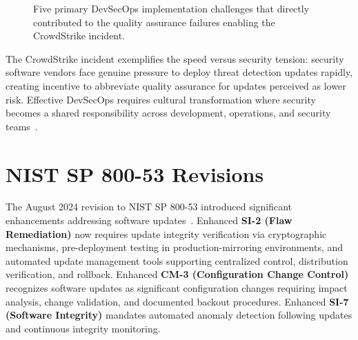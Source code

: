 \documentclass[sigconf,nonacm]{acmart}
\begin{document}
\begin{figure}[h]
\centering
{}
\caption{Five primary DevSecOps implementation challenges that directly contributed
  to the quality assurance failures enabling the CrowdStrike incident.}
\label{fig:challenges}
\end{figure}

The CrowdStrike incident exemplifies the speed versus security tension: security software
vendors face genuine pressure to deploy threat detection updates rapidly, creating incentive
to abbreviate quality assurance for updates perceived as lower risk. Effective DevSecOps
requires cultural transformation where security becomes a shared responsibility across
development, operations, and security teams~\cite{rajapakse2022challenges}.

\section{NIST SP 800-53 Revisions}

The August 2024 revision to NIST SP 800-53 introduced significant enhancements addressing
software updates~\cite{nist2024sp80053}. Enhanced \textbf{SI-2 (Flaw Remediation)} now
requires update integrity verification via cryptographic mechanisms, pre-deployment testing
in production-mirroring environments, and automated update management tools supporting
centralized control, distribution verification, and rollback. Enhanced \textbf{CM-3
(Configuration Change Control)} recognizes software updates as significant configuration
changes requiring impact analysis, change validation, and documented backout procedures.
Enhanced \textbf{SI-7 (Software Integrity)} mandates automated anomaly detection following
updates and continuous integrity monitoring.
\end{document}

